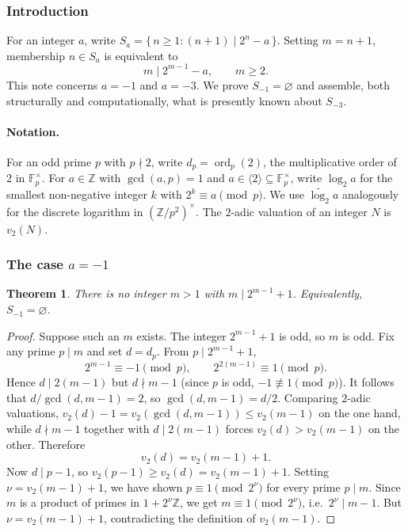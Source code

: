\documentclass[a4paper]{article}
\theoremstyle{plain}
\newtheorem{theorem}{Theorem}[subsection]
\theoremstyle{definition}
\theoremstyle{remark}
\newcommand{\Z}{\mathbb{Z}}
\newcommand{\F}{\mathbb{F}}
\newcommand{\ord}{\operatorname{ord}}
\newcommand{\gen}[1]{\langle #1 \rangle}
\begin{document}
\subsubsection{Introduction}

For an integer $a$, write $S_{a}=\{\,n\ge 1:(n+1)\mid 2^{n}-a\,\}$. Setting $m=n+1$, membership
$n\in S_{a}$ is equivalent to
\begin{equation}\label{d1:eq:main}
m\mid 2^{m-1}-a,\qquad m\ge 2.
\end{equation}
This note concerns $a=-1$ and $a=-3$. We prove $S_{-1}=\varnothing$ and assemble, both
structurally and computationally, what is presently known about $S_{-3}$.

\paragraph{Notation.}
For an odd prime $p$ with $p\nmid 2$, write $d_{p}=\ord_{p}(2)$, the multiplicative order of $2$
in $\F_{p}^{\times}$. For $a\in\Z$ with $\gcd(a,p)=1$ and $a\in\gen{2}\subseteq\F_{p}^{\times}$,
write $\log_{2}a$ for the smallest non-negative integer $k$ with $2^{k}\equiv a\pmod{p}$. We use
$\widetilde{\log_{2}}a$ analogously for the discrete logarithm in $(\Z/p^{2})^{\times}$. The
$2$-adic valuation of an integer $N$ is $v_{2}(N)$.

\subsubsection{The case \texorpdfstring{$a=-1$}{a=-1}}

\begin{theorem}\label{d1:thm:minus1}
There is no integer $m>1$ with $m\mid 2^{m-1}+1$. Equivalently, $S_{-1}=\varnothing$.
\end{theorem}

\begin{proof}
Suppose such an $m$ exists. The integer $2^{m-1}+1$ is odd, so $m$ is odd. Fix any prime
$p\mid m$ and set $d=d_{p}$. From $p\mid 2^{m-1}+1$,
\[
2^{m-1}\equiv-1\pmod{p},\qquad 2^{2(m-1)}\equiv 1\pmod{p}.
\]
Hence $d\mid 2(m-1)$ but $d\nmid m-1$ (since $p$ is odd, $-1\not\equiv 1\pmod{p}$). It follows
that $d/\gcd(d,m-1)=2$, so $\gcd(d,m-1)=d/2$. Comparing $2$-adic valuations,
$v_{2}(d)-1=v_{2}(\gcd(d,m-1))\le v_{2}(m-1)$ on the one hand, while $d\nmid m-1$ together with
$d\mid 2(m-1)$ forces $v_{2}(d)>v_{2}(m-1)$ on the other. Therefore
\begin{equation}\label{d1:eq:val}
v_{2}(d)=v_{2}(m-1)+1.
\end{equation}
Now $d\mid p-1$, so $v_{2}(p-1)\ge v_{2}(d)=v_{2}(m-1)+1$. Setting $\nu=v_{2}(m-1)+1$, we have
shown $p\equiv 1\pmod{2^{\nu}}$ for every prime $p\mid m$. Since $m$ is a product of primes in
$1+2^{\nu}\Z$, we get $m\equiv 1\pmod{2^{\nu}}$, i.e.\ $2^{\nu}\mid m-1$. But
$\nu=v_{2}(m-1)+1$, contradicting the definition of $v_{2}(m-1)$.
\end{proof}
\end{document}

